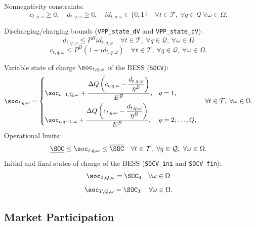 Nonnegativity constraints:
\begin{equation} \label{dVdCPos2}
	c_{t,q, \omega} \geq 0, \quad d_{t,q, \omega} \geq 0, \quad id_{t,q, \omega} \in \{ 0, 1 \} \quad \forall t \in \mathcal{T}, \ \forall q \in \mathcal{Q}\ \forall \omega \in \Omega.
\end{equation}

Discharging/charging bounds (\verb|VPP_state_dV| and \verb|VPP_state_cV|):
\begin{equation} \label{EQ:VPP_state_dV2}
	d_{t,q, \omega} \leq P^B id_{t,q, \omega} \quad \forall t \in \mathcal{T}, \ \forall q \in \mathcal{Q}, \ \forall \omega \in \Omega
\end{equation}
\begin{equation} \label{EQ:VPP_state_cV2}
	c_{t,q, \omega} \leq P^B (1 - id_{t,q, \omega}) \quad \forall t \in \mathcal{T}, \ \forall q \in \mathcal{Q},\ \forall \omega \in \Omega.
\end{equation}

Variable state of charge $\soc_{t, q,\omega}$ of the BESS (\verb|SOCV|):
\begin{equation}
\label{EQ:SOCV2}
\soc_{t,q,\omega} =
\begin{cases}
\soc_{t-1,Q,\omega} + \dfrac{\Delta Q \left(c_{t,q,\omega} - \dfrac{d_{t,q,\omega}}{\eta^B}\right)}{E^B}, & q = 1, \\[8pt]
\soc_{t,q-1,\omega} + \dfrac{\Delta Q \left(c_{t,q,\omega} - \dfrac{d_{t,q,\omega}}{\eta^B}\right)}{E^B}, & q = 2,\ldots,Q,
\end{cases}
\quad \forall t \in \mathcal{T},\; \forall \omega \in \Omega.
\end{equation}
Operational limits:
\begin{equation} \label{EQ:socVOperLimits2}
	\underline{\SOC} \leq \soc_{t,q, \omega} \leq \overline{\SOC} \quad \forall t \in \mathcal{T}, \ \forall q \in \mathcal{Q},\ \forall \omega \in \Omega.
\end{equation}
Initial and final states of charge of the BESS (\verb|SOCV_ini| and \verb|SOCV_fin|):
\begin{equation} \label{EQ:SOCV_ini2}
	\soc_{0, Q, \omega} = \SOC_0 \quad \forall \omega \in \Omega
\end{equation}
\begin{equation} \label{EQ:SOCV_fin2}
	\soc_{T, Q,\omega} = \SOC_T \quad \forall \omega \in \Omega.
\end{equation}

\subsection{Market Participation}
\label{SEC:MarketParticipation2}

